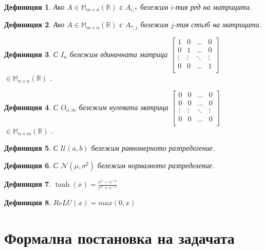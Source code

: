 \documentclass[a4paper,12pt]{article}
\newtheorem{defn}{Дефиниция}[section]
\begin{document}
\begin{defn}
Ако $A \in \mathbb{M}_{m \times n} (\mathbb{R})$ с $A_{i, *}$ бележим $i$-тия ред на матрицата.
\end{defn}

\begin{defn}
Ако $A \in \mathbb{M}_{m \times n} (\mathbb{R})$ с $A_{*, j}$ бележим $j$-тия стълб на матрицата.
\end{defn}

\begin{defn}
С $I_n$ бележим единичната матрица $\begin{bmatrix}
  1      & 0      & \dots  & 0 \\ 
  0      & 1      & \dots  & 0 \\ 
  \vdots & \vdots & \ddots & \vdots \\
  0      & 0      & \dots  & 1 \\ 
\end{bmatrix}$ $\in \mathbb{M}_{n \times n} (\mathbb{R})$ .
\end{defn}

\begin{defn}
С $O_{n,m}$ бележим нулевата матрица $\begin{bmatrix}
  0      & 0      & \dots  & 0 \\ 
  0      & 0      & \dots  & 0 \\ 
  \vdots & \vdots & \ddots & \vdots \\
  0      & 0      & \dots  & 0 \\ 
\end{bmatrix}$ $\in \mathbb{M}_{n \times m} (\mathbb{R})$ .
\end{defn}

\begin{defn}
С $\mathcal{U}(a,b)$ бележим равномерното разпределение.
\end{defn}

\begin{defn}
С $\mathcal{N}(\mu, \sigma^2)$ бележим нормалното разпределение.
\end{defn}

\begin{defn}
$\tanh(x) = \frac{e^x - e^{-x}}{e^x + e^{-x}}$
\end{defn}

\begin{defn} $ReLU(x)= max(0, x)$
\end{defn}

\pagebreak

\section{Формална постановка на задачата}
\end{document}
